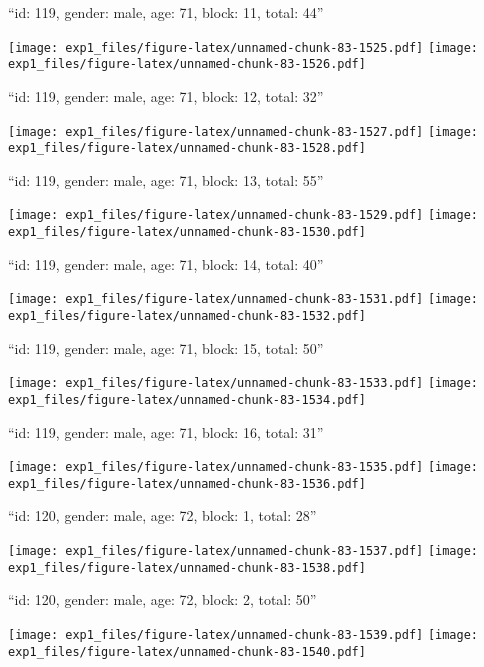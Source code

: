 \documentclass[11pt,,]{article}
\begin{document}
\newpage
[1] 

``id: 119, gender: male, age: 71, block: 11, total: 44''

\texttt{[image: exp1\_files/figure-latex/unnamed-chunk-83-1525.pdf]}
\texttt{[image: exp1\_files/figure-latex/unnamed-chunk-83-1526.pdf]}

\newpage
[1] 

``id: 119, gender: male, age: 71, block: 12, total: 32''

\texttt{[image: exp1\_files/figure-latex/unnamed-chunk-83-1527.pdf]}
\texttt{[image: exp1\_files/figure-latex/unnamed-chunk-83-1528.pdf]}

\newpage
[1] 

``id: 119, gender: male, age: 71, block: 13, total: 55''

\texttt{[image: exp1\_files/figure-latex/unnamed-chunk-83-1529.pdf]}
\texttt{[image: exp1\_files/figure-latex/unnamed-chunk-83-1530.pdf]}

\newpage
[1] 

``id: 119, gender: male, age: 71, block: 14, total: 40''

\texttt{[image: exp1\_files/figure-latex/unnamed-chunk-83-1531.pdf]}
\texttt{[image: exp1\_files/figure-latex/unnamed-chunk-83-1532.pdf]}

\newpage
[1] 

``id: 119, gender: male, age: 71, block: 15, total: 50''

\texttt{[image: exp1\_files/figure-latex/unnamed-chunk-83-1533.pdf]}
\texttt{[image: exp1\_files/figure-latex/unnamed-chunk-83-1534.pdf]}

\newpage
[1] 

``id: 119, gender: male, age: 71, block: 16, total: 31''

\texttt{[image: exp1\_files/figure-latex/unnamed-chunk-83-1535.pdf]}
\texttt{[image: exp1\_files/figure-latex/unnamed-chunk-83-1536.pdf]}

\newpage
[1] 

``id: 120, gender: male, age: 72, block: 1, total: 28''

\texttt{[image: exp1\_files/figure-latex/unnamed-chunk-83-1537.pdf]}
\texttt{[image: exp1\_files/figure-latex/unnamed-chunk-83-1538.pdf]}

\newpage
[1] 

``id: 120, gender: male, age: 72, block: 2, total: 50''

\texttt{[image: exp1\_files/figure-latex/unnamed-chunk-83-1539.pdf]}
\texttt{[image: exp1\_files/figure-latex/unnamed-chunk-83-1540.pdf]}
\end{document}
